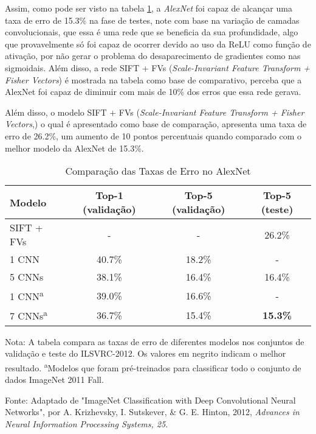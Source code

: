 Assim, como pode ser visto na tabela \ref{tab:desempenho-alexnet}, a \textit{AlexNet} foi capaz de alcançar uma taxa de erro de 15.3\% na fase de testes, note com base na variação de camadas convolucionais, que essa é uma rede que se beneficia da sua profundidade, algo que provavelmente só foi capaz de ocorrer devido ao uso da ReLU como função de ativação, por não gerar o problema do desaparecimento de gradientes como nas sigmoidais. Além disso, a rede SIFT + FVs (\textit{Scale-Invariant Feature Transform + Fisher Vectors}) é mostrada na tabela como base de comparativo, perceba que a AlexNet foi capaz de diminuir com mais de 10\% dos erros que essa rede gerava.

Além disso, o modelo SIFT + FVs (\textit{Scale-Invariant Feature Transform + Fisher Vectors},) o qual é apresentado como base de comparação, apresenta uma taxa de erro de 26.2\%, um aumento de 10 pontos percentuais quando comparado com o melhor modelo da AlexNet de 15.3\%.

\begin{table}[ht]
    \centering
    \begin{threeparttable}
        \caption{Comparação das Taxas de Erro no AlexNet}
        \label{tab:desempenho-alexnet}
        \begin{tabular}{lccc}
            \toprule
            \textbf{Modelo} & \textbf{Top-1 (validação)} & \textbf{Top-5 (validação)} & \textbf{Top-5 (teste)} \\
            \midrule
            SIFT + FVs & -    & -      & 26.2\% \\
            1 CNN      & 40.7\% & 18.2\% & -      \\
            5 CNNs     & 38.1\% & 16.4\% & 16.4\% \\
            1 CNN\textsuperscript{a}      & 39.0\% & 16.6\% & -      \\
            7 CNNs\textsuperscript{a}     & 36.7\% & 15.4\% & \textbf{15.3\%} \\
            \bottomrule
        \end{tabular}
        
        \begin{tablenotes}[para] %
            \small %
            \item[] Nota: A tabela compara as taxas de erro de diferentes modelos nos conjuntos de validação e teste do ILSVRC-2012. Os valores em negrito indicam o melhor resultado. \textsuperscript{a}Modelos que foram pré-treinados para classificar todo o conjunto de dados ImageNet 2011 Fall.
            \item[] Fonte: Adaptado de "ImageNet Classification with Deep Convolutional Neural Networks", por A. Krizhevsky, I. Sutskever, \& G. E. Hinton, 2012, \textit{Advances in Neural Information Processing Systems, 25}.
        \end{tablenotes}

    \end{threeparttable}
\end{table}

